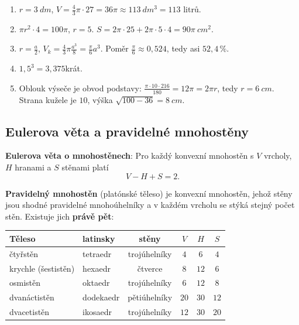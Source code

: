 \begin{solution}
  \begin{enumerate}[label=(\alph*)]
    \item $r = 3\ \si{dm}$, $V = \frac{4}{3}\pi\cdot 27 = 36\pi\approx 113\ \si{dm^3} = 113$ litrů.
    \item $\pi r^2\cdot 4 = 100\pi$, $r = 5$. $S = 2\pi\cdot 25 + 2\pi\cdot 5\cdot 4 = 90\pi\ \si{cm^2}$.
    \item $r = \frac{a}{2}$, $V_k = \frac{4}{3}\pi\frac{a^3}{8} = \frac{\pi}{6}a^3$. Poměr $\frac{\pi}{6}\approx 0{,}524$, tedy asi $52{,}4\,\%$.
    \item $1{,}5^3 = 3{,}375$krát.
    \item Oblouk výseče je obvod podstavy: $\frac{\pi\cdot 10\cdot 216}{180} = 12\pi = 2\pi r$, tedy $r = 6\ \si{cm}$. Strana kužele je $10$, výška $\sqrt{100 - 36} = 8\ \si{cm}$.
  \end{enumerate}
\end{solution}

\subsection{Eulerova věta a pravidelné mnohostěny}\label{sec:eulerova-veta}

\begin{definitionbox}
  \textbf{Eulerova věta o mnohostěnech}: Pro každý konvexní mnohostěn s $V$ vrcholy, $H$ hranami a $S$ stěnami platí
  \begin{equation*}
    V - H + S = 2.
  \end{equation*}

  \textbf{Pravidelný mnohostěn} (platónské těleso) je konvexní mnohostěn, jehož stěny jsou shodné pravidelné mnohoúhelníky a v každém vrcholu se stýká stejný počet stěn. Existuje jich \textbf{právě pět}:
  \begin{center}
    \renewcommand{\arraystretch}{1.3}
    \begin{tabular}{|l|l|c|c|c|c|}
      \hline
      Těleso & latinsky & stěny & $V$ & $H$ & $S$ \\
      \hline
      čtyřstěn & tetraedr & trojúhelníky & $4$ & $6$ & $4$ \\
      krychle (šestistěn) & hexaedr & čtverce & $8$ & $12$ & $6$ \\
      osmistěn & oktaedr & trojúhelníky & $6$ & $12$ & $8$ \\
      dvanáctistěn & dodekaedr & pětiúhelníky & $20$ & $30$ & $12$ \\
      dvacetistěn & ikosaedr & trojúhelníky & $12$ & $30$ & $20$ \\
      \hline
    \end{tabular}
  \end{center}
\end{definitionbox}

